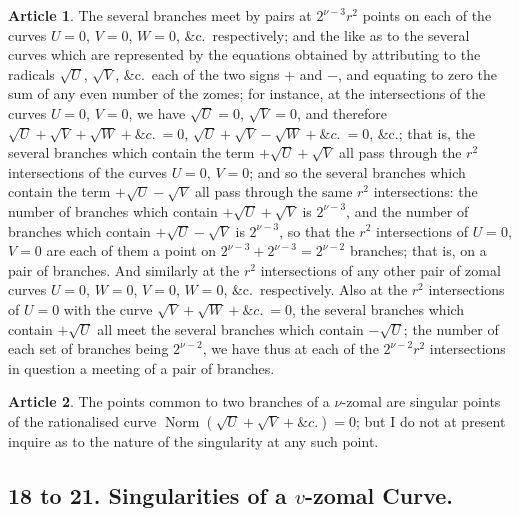 \documentclass[11pt,a4paper]{article}
\theoremstyle{definition}
\newtheorem{art}{Article}
\DeclareMathOperator{\Norm}{Norm}
\newcommand{\norm}{\Norm}
\begin{document}
\begin{art}
The several branches meet by pairs at $2^{\nu-3}r^{2}$ points on each of the curves $U = 0$, $V = 0$, $W = 0$, \&c.\ respectively; and the like as to the several curves which are represented by the equations obtained by attributing to the radicals $\sqrt{U}$, $\sqrt{V}$, \&c.\ each of the two signs $+$ and $-$, and equating to zero the sum of any even number of the zomes; for instance, at the intersections of the curves $U = 0$, $V = 0$, we have $\sqrt{U} = 0$, $\sqrt{V} = 0$, and therefore $\sqrt{U} + \sqrt{V} + \sqrt{W} + \&c.\ = 0$, $\sqrt{U} + \sqrt{V} - \sqrt{W} + \&c.\ = 0$, \&c.; that is, the several branches which contain the term $+\sqrt{U} + \sqrt{V}$ all pass through the $r^{2}$ intersections of the curves $U = 0$, $V = 0$; and so the several branches which contain the term $+\sqrt{U} - \sqrt{V}$ all pass through the same $r^{2}$ intersections: the number of branches which contain $+\sqrt{U} + \sqrt{V}$ is $2^{\nu-3}$, and the number of branches which contain $+\sqrt{U} - \sqrt{V}$ is $2^{\nu-3}$, so that the $r^{2}$ intersections of $U = 0$, $V = 0$ are each of them a point on $2^{\nu-3} + 2^{\nu-3} = 2^{\nu-2}$ branches; that is, on a pair of branches. And similarly at the $r^{2}$ intersections of any other pair of zomal curves $U = 0$, $W = 0$, $V = 0$, $W = 0$, \&c.\ respectively. Also at the $r^{2}$ intersections of $U = 0$ with the curve $\sqrt{V} + \sqrt{W} + \&c.\ = 0$, the several branches which contain $+\sqrt{U}$ all meet the several branches which contain $-\sqrt{U}$; the number of each set of branches being $2^{\nu-2}$, we have thus at each of the $2^{\nu-2}r^{2}$ intersections in question a meeting of a pair of branches.
\end{art}

\begin{art}
The points common to two branches of a $\nu$-zomal are singular points of the rationalised curve $\norm(\sqrt{U} + \sqrt{V} + \&c.) = 0$; but I do not at present inquire as to the nature of the singularity at any such point.
\end{art}

\subsection*{18 to 21. Singularities of a $v$-zomal Curve.}
\end{document}
